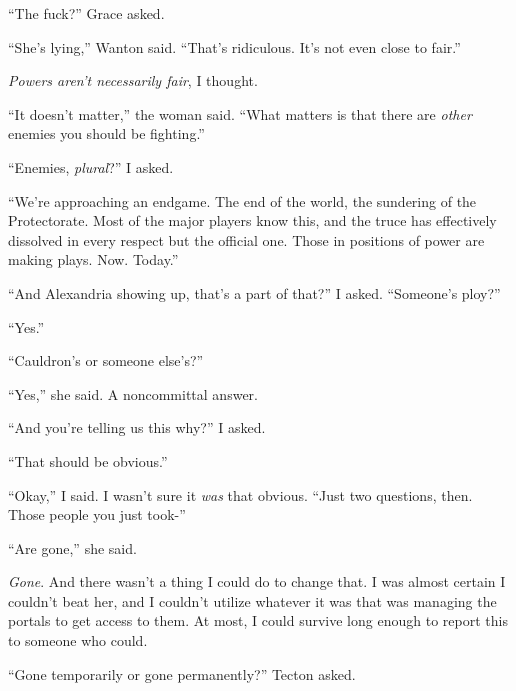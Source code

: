 ``The fuck?'' Grace asked.



``She's lying,'' Wanton said.  ``That's ridiculous.  It's not even close to fair.''



\emph{Powers aren't necessarily fair}, I thought.



``It doesn't matter,'' the woman said.  ``What matters is that there are \emph{other} enemies you should be fighting.''



``Enemies, \emph{plural}?'' I asked.



``We're approaching an endgame.  The end of the world, the sundering of the Protectorate.  Most of the major players know this, and the truce has effectively dissolved in every respect but the official one.  Those in positions of power are making plays.  Now.  Today.''



``And Alexandria showing up, that's a part of that?''  I asked.  ``Someone's ploy?''



``Yes.''



``Cauldron's or someone else's?''



``Yes,'' she said.  A noncommittal answer.



``And you're telling us this why?'' I asked.



``That should be obvious.''



``Okay,'' I said.  I wasn't sure it \emph{was} that obvious.  ``Just two questions, then.  Those people you just took-''



``Are gone,'' she said.



\emph{Gone}.  And there wasn't a thing I could do to change that.  I was almost certain I couldn't beat her, and I couldn't utilize whatever it was that was managing the portals to get access to them.  At most, I could survive long enough to report this to someone who could.



``Gone temporarily or gone permanently?'' Tecton asked.



